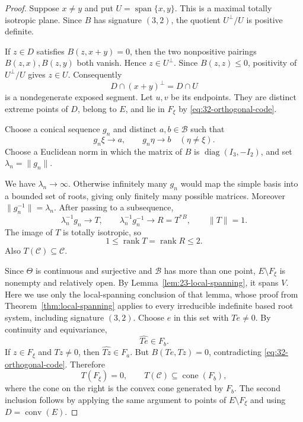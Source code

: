 \documentclass[11pt,reqno]{amsart}
\theoremstyle{plain}
\theoremstyle{definition}
\theoremstyle{remark}
\numberwithin{equation}{section}
\begin{document}
\begin{proof}
Suppose $x\ne y$ and put $U=\operatorname{span}\{x,y\}$.
This is a maximal totally isotropic plane.
Since $B$ has signature $(3,2)$, the quotient
$U^\perp/U$ is positive definite.

If $z\in D$ satisfies $B(z,x+y)=0$, then the two
nonpositive pairings $B(z,x),B(z,y)$ both vanish.
Hence $z\in U^\perp$.
Since $B(z,z)\leq0$, positivity of $U^\perp/U$ gives
$z\in U$.
Consequently
\[
    D\cap(x+y)^\perp=D\cap U
\]
is a nondegenerate exposed segment.
Let $u,v$ be its endpoints.
They are distinct extreme points of $D$, belong to $E$,
and lie in $F_\xi$ by
\eqref{eq:32-orthogonal-code}.

Choose a conical sequence $g_n$ and distinct
$a,b\in\mathcal B$ such that
\begin{equation}\label{eq:32-conical-sequence}
    g_n\xi\to a,\qquad
    g_n\eta\to b\quad(\eta\ne\xi).
\end{equation}
Choose a Euclidean norm in which the matrix of $B$ is
$\operatorname{diag}(I_3,-I_2)$, and set
$\lambda_n=\|g_n\|$.

We have $\lambda_n\to\infty$.
Otherwise infinitely many $g_n$ would map the simple basis
into a bounded set of roots, giving only finitely many
possible matrices.
Moreover $\|g_n^{-1}\|=\lambda_n$.
After passing to a subsequence,
\[
    \lambda_n^{-1}g_n\to T,\qquad
    \lambda_n^{-1}g_n^{-1}\to R=T^{*B},
    \qquad \|T\|=1.
\]
The image of $T$ is totally isotropic, so
\begin{equation}\label{eq:32-rank-bound}
    1\leq\operatorname{rank}T
      =\operatorname{rank}R\leq2.
\end{equation}
Also $T(\mathcal C)\subseteq\mathcal C$.

Since $\Theta$ is continuous and surjective and $\mathcal B$ has
more than one point, $E\setminus F_\xi$ is nonempty and relatively open.
By Lemma~\ref{lem:23-local-spanning}, it spans $V$.
Here we use only the local-spanning conclusion of that lemma,
whose proof from Theorem~\ref{thm:local-spanning} applies to every
irreducible indefinite based root system, including signature $(3,2)$.
Choose $e$ in this set with $Te\ne0$.
By continuity and equivariance,
\[
    \widehat{Te}\in F_b.
\]
If $z\in F_\xi$ and $Tz\ne0$, then
$\widehat{Tz}\in F_a$.
But $B(Te,Tz)=0$, contradicting
\eqref{eq:32-orthogonal-code}.
Therefore
\begin{equation}\label{eq:32-T-image}
    T(F_\xi)=0,\qquad
    T(\mathcal C)\subseteq\operatorname{cone}(F_b),
\end{equation}
where the cone on the right is the convex cone generated
by $F_b$.
The second inclusion follows by applying the same argument
to points of $E\setminus F_\xi$ and using
$D=\operatorname{conv}(E)$.


\end{proof}
\end{document}
